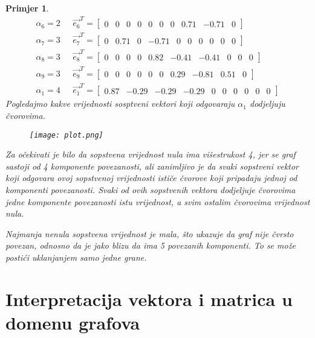 \documentclass[11pt]{article}
\newtheorem{example}{Primjer}
\begin{document}
\begin{example}
\[\begin{split}
			\alpha_6=2 \text{  } & \vec{e_6}^T = \begin{bmatrix} 0  &  0  &  0  &  0  &  0  &  0  &  0  &  0.71  &  -0.71  &  0           \end{bmatrix} \\
			\alpha_7=3 \text{  } & \vec{e_7}^T = \begin{bmatrix} 0  &  0.71  &  0  &  -0.71  &  0  &  0  &  0  &  0  &  0  &  0           \end{bmatrix} \\
			\alpha_8=3 \text{  } & \vec{e_8}^T = \begin{bmatrix} 0  &  0  &  0  &  0  &  0.82  &  -0.41  &  -0.41  &  0  &  0  &  0       \end{bmatrix} \\
			\alpha_9=3 \text{  } & \vec{e_9}^T = \begin{bmatrix} 0  &  0  &  0  &  0  &  0  &  0  &  0.29  &  -0.81  &  0.51  &  0        \end{bmatrix} \\
			\alpha_1=4 \text{  } & \vec{e_1}^T = \begin{bmatrix} 0.87  &  -0.29  &  -0.29  &  -0.29  &  0  &  0  &  0  &  0  &  0  &  0  \end{bmatrix}
		\end{split}
		\]
		Pogledajmo kakve vrijednosti sosptveni vektori koji odgovaraju $\alpha_1$ dodjeljuju čvorovima. 
		\begin{figure}[h]
			\centering
			\texttt{[image: plot.png]}
		\end{figure}
		
		Za očekivati je bilo da sopstvena vrijednost nula ima višestrukost 4, jer se graf sastoji od 4 komponente povezanosti, ali zanimljivo je
		da svaki sopstveni vektor koji odgovara ovoj sopstvenoj vrijednosti ističe čvorove koji pripadaju jednoj od komponenti povezanosti.
		Svaki od ovih sopstvenih vektora dodjeljuje čvorovima jedne komponente povezanosti istu vrijednost, a svim ostalim čvorovima vrijednost nula. 
		
		Najmanja nenula sopstvena vrijednost je mala, što ukazuje da graf nije čvrsto povezan, odnosno da je
        jako blizu da ima 5 povezanih komponenti. To se može postići uklanjanjem samo jedne grane.
	\end{example}

	\section{Interpretacija vektora i matrica u domenu grafova}
\end{document}
